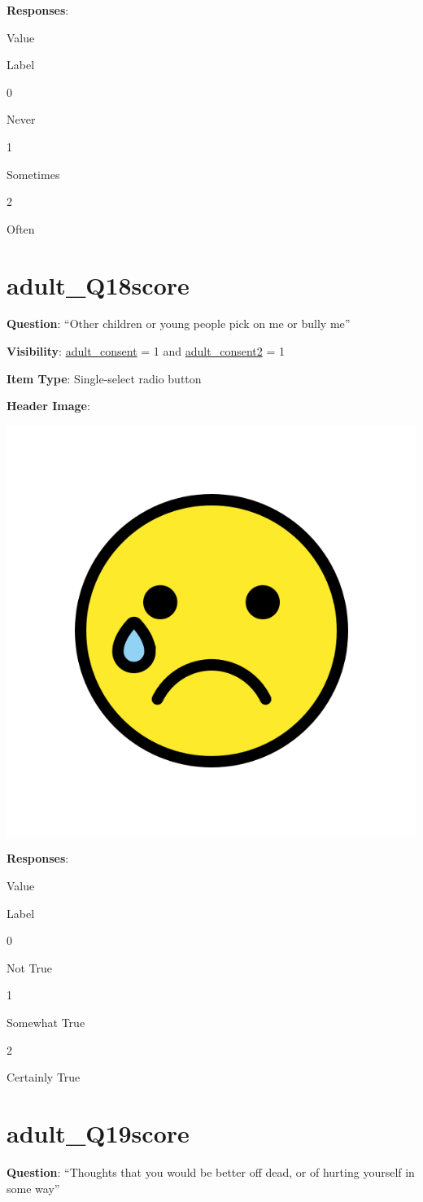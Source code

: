 \documentclass[]{book}
\begin{document}
\textbf{Responses}:

Value

Label

0

Never

1

Sometimes

2

Often

\hypertarget{adult_q18score}{%
\section{adult\_Q18score}\label{adult_q18score}}

\textbf{Question}: ``Other children or young people pick on me or bully me''

\textbf{Visibility}: \protect\hyperlink{adult_consent}{adult\_consent} = 1 and \protect\hyperlink{adult_consent2}{adult\_consent2} = 1

\textbf{Item Type}: Single-select radio button

\textbf{Header Image}:

\begin{flushleft}\includegraphics[width=0.33\linewidth]{downloadFigs4latex_HBN_PMHS_Codebook/adult_Q18score_headerImg} \end{flushleft}

\textbf{Responses}:

Value

Label

0

Not True

1

Somewhat True

2

Certainly True

\hypertarget{adult_q19score}{%
\section{adult\_Q19score}\label{adult_q19score}}

\textbf{Question}: ``Thoughts that you would be better off dead, or of hurting yourself in some way''
\end{document}
